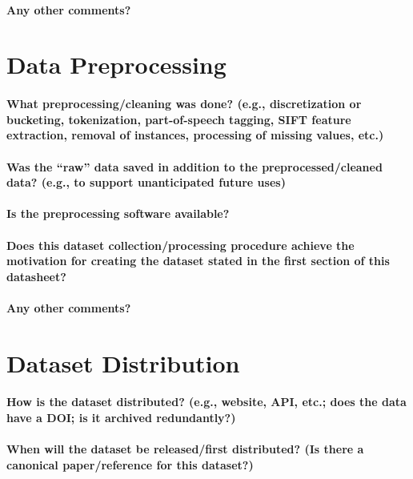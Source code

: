 \documentclass{article}
\begin{document}
\begin{multicols}{2}
\paragraph{Any other comments?}
\section{Data Preprocessing}
\paragraph{What preprocessing/cleaning was done? (e.g., discretization or bucketing, tokenization, part-of-speech tagging,
SIFT feature extraction, removal of instances, processing of
missing values, etc.)}
\paragraph{Was the “raw” data saved in addition to the preprocessed/cleaned data? (e.g., to support unanticipated future uses)}
\paragraph{Is the preprocessing software available?}
\paragraph{Does this dataset collection/processing procedure
achieve the motivation for creating the dataset stated
in the first section of this datasheet?}
\paragraph{Any other comments?}
\section{Dataset Distribution}
\paragraph{How is the dataset distributed? (e.g., website, API, etc.;
does the data have a DOI; is it archived redundantly?)}
\paragraph{When will the dataset be released/first distributed? (Is
there a canonical paper/reference for this dataset?)}

\end{multicols}
\end{document}
